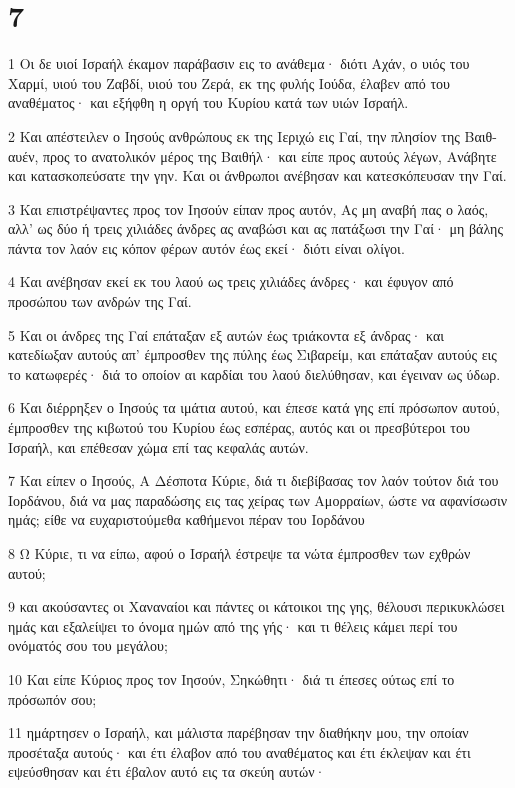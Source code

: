 \chapter{7}

\par 1 Οι δε υιοί Ισραήλ έκαμον παράβασιν εις το ανάθεμα· διότι Αχάν, ο υιός του Χαρμί, υιού του Ζαβδί, υιού του Ζερά, εκ της φυλής Ιούδα, έλαβεν από του αναθέματος· και εξήφθη η οργή του Κυρίου κατά των υιών Ισραήλ.
\par 2 Και απέστειλεν ο Ιησούς ανθρώπους εκ της Ιεριχώ εις Γαί, την πλησίον της Βαιθ-αυέν, προς το ανατολικόν μέρος της Βαιθήλ· και είπε προς αυτούς λέγων, Ανάβητε και κατασκοπεύσατε την γην. Και οι άνθρωποι ανέβησαν και κατεσκόπευσαν την Γαί.
\par 3 Και επιστρέψαντες προς τον Ιησούν είπαν προς αυτόν, Ας μη αναβή πας ο λαός, αλλ' ως δύο ή τρεις χιλιάδες άνδρες ας αναβώσι και ας πατάξωσι την Γαί· μη βάλης πάντα τον λαόν εις κόπον φέρων αυτόν έως εκεί· διότι είναι ολίγοι.
\par 4 Και ανέβησαν εκεί εκ του λαού ως τρεις χιλιάδες άνδρες· και έφυγον από προσώπου των ανδρών της Γαί.
\par 5 Και οι άνδρες της Γαί επάταξαν εξ αυτών έως τριάκοντα εξ άνδρας· και κατεδίωξαν αυτούς απ' έμπροσθεν της πύλης έως Σιβαρείμ, και επάταξαν αυτούς εις το κατωφερές· διά το οποίον αι καρδίαι του λαού διελύθησαν, και έγειναν ως ύδωρ.
\par 6 Και διέρρηξεν ο Ιησούς τα ιμάτια αυτού, και έπεσε κατά γης επί πρόσωπον αυτού, έμπροσθεν της κιβωτού του Κυρίου έως εσπέρας, αυτός και οι πρεσβύτεροι του Ισραήλ, και επέθεσαν χώμα επί τας κεφαλάς αυτών.
\par 7 Και είπεν ο Ιησούς, Α Δέσποτα Κύριε, διά τι διεβίβασας τον λαόν τούτον διά του Ιορδάνου, διά να μας παραδώσης εις τας χείρας των Αμορραίων, ώστε να αφανίσωσιν ημάς; είθε να ευχαριστούμεθα καθήμενοι πέραν του Ιορδάνου
\par 8 Ω Κύριε, τι να είπω, αφού ο Ισραήλ έστρεψε τα νώτα έμπροσθεν των εχθρών αυτού;
\par 9 και ακούσαντες οι Χαναναίοι και πάντες οι κάτοικοι της γης, θέλουσι περικυκλώσει ημάς και εξαλείψει το όνομα ημών από της γής· και τι θέλεις κάμει περί του ονόματός σου του μεγάλου;
\par 10 Και είπε Κύριος προς τον Ιησούν, Σηκώθητι· διά τι έπεσες ούτως επί το πρόσωπόν σου;
\par 11 ημάρτησεν ο Ισραήλ, και μάλιστα παρέβησαν την διαθήκην μου, την οποίαν προσέταξα αυτούς· και έτι έλαβον από του αναθέματος και έτι έκλεψαν και έτι εψεύσθησαν και έτι έβαλον αυτό εις τα σκεύη αυτών·
